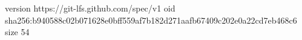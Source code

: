 version https://git-lfs.github.com/spec/v1
oid sha256:b940588c02b071628e0bff559af7b182d271aafb67409c202e0a22cd7eb468c6
size 54
